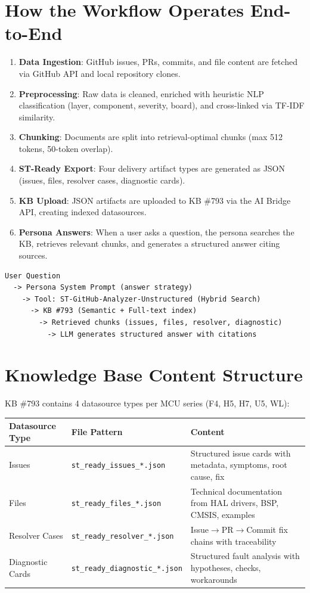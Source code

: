 \documentclass[12pt,a4paper]{report}
\begin{document}
\section{How the Workflow Operates End-to-End}

\begin{enumerate}
  \item \textbf{Data Ingestion}: GitHub issues, PRs, commits, and file content are fetched via GitHub API and local repository clones.
  \item \textbf{Preprocessing}: Raw data is cleaned, enriched with heuristic NLP classification (layer, component, severity, board), and cross-linked via TF-IDF similarity.
  \item \textbf{Chunking}: Documents are split into retrieval-optimal chunks (max 512 tokens, 50-token overlap).
  \item \textbf{ST-Ready Export}: Four delivery artifact types are generated as JSON (issues, files, resolver cases, diagnostic cards).
  \item \textbf{KB Upload}: JSON artifacts are uploaded to KB \#793 via the AI Bridge API, creating indexed datasources.
  \item \textbf{Persona Answers}: When a user asks a question, the persona searches the KB, retrieves relevant chunks, and generates a structured answer citing sources.
\end{enumerate}

\begin{verbatim}
User Question
  -> Persona System Prompt (answer strategy)
    -> Tool: ST-GitHub-Analyzer-Unstructured (Hybrid Search)
      -> KB #793 (Semantic + Full-text index)
        -> Retrieved chunks (issues, files, resolver, diagnostic)
          -> LLM generates structured answer with citations
\end{verbatim}

\section{Knowledge Base Content Structure}

KB \#793 contains 4 datasource types per MCU series (F4, H5, H7, U5, WL):

\begin{longtable}{p{4cm}p{4cm}p{5cm}}
\toprule
\textbf{Datasource Type} & \textbf{File Pattern} & \textbf{Content} \\
\midrule
Issues & \texttt{st\_ready\_issues\_*.json} & Structured issue cards with metadata, symptoms, root cause, fix \\
Files & \texttt{st\_ready\_files\_*.json} & Technical documentation from HAL drivers, BSP, CMSIS, examples \\
Resolver Cases & \texttt{st\_ready\_resolver\_*.json} & Issue$\to$PR$\to$Commit fix chains with traceability \\
Diagnostic Cards & \texttt{st\_ready\_diagnostic\_*.json} & Structured fault analysis with hypotheses, checks, workarounds \\
\bottomrule
\end{longtable}
\end{document}
